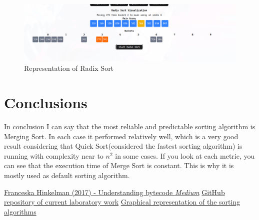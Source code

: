 \documentclass[12pt]{article}
\begin{document}
\begin{figure}[h]
    \centering
    \includegraphics[width=1\textwidth]{radix_im.png}
    \caption{Representation of Radix Sort}
\end{figure}
\clearpage
\section*{Conclusions}
\hspace{0.6cm} 
In conclusion I can say that the most reliable and predictable sorting algorithm is Merging Sort.
In each case it performed relatively well, which is a very good result considering 
that Quick Sort(considered the fastest sorting algorithm) is running with 
complexity near to $n^2$ in some cases. If you look at each metric, you can see that the execution time of
Merge Sort is constant. This is why it is mostly used as default sorting algorithm.

\begin{thebibliography}{9}

   \href{https://medium.com/dailyjs/understanding-v8s-bytecode-317d46c94775}{Franceska
      Hinkelman (2017) - Understanding bytecode \emph{Medium}}
   \href{https://github.com/DdimaPos/AA-labs/tree/main/Lab2}{GitHub repository of current laboratory work}
   \href{https://sorting-algorithms-visualizer-rho.vercel.app/}{Graphical representation of the sorting algorithms}
\end{thebibliography}
\end{document}
